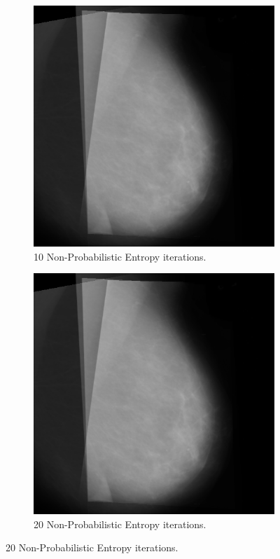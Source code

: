 \begin{figure}[H]
\begin{subfigure}[t]{0.3\textwidth}
      \includegraphics[width=\textwidth]{Appendix5/sample1/nonProb/nonProb10.png}
      \caption{10 Non-Probabilistic Entropy iterations.}
      \label{fig:app-10-nonProb-sample1}
    \end{subfigure} \hfill
    \begin{subfigure}[t]{0.3\textwidth}
      \includegraphics[width=\textwidth]{Appendix5/sample1/nonProb/nonProb20.png}
      \caption{20 Non-Probabilistic Entropy iterations.}
      \label{fig:app-20-nonProb-sample1}
    \end{subfigure}
\end{figure}

